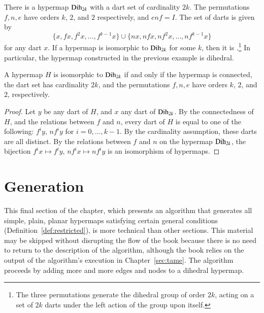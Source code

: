 \begin{example}[dihedral]\label{ex:D2k} 
There is a hypermap ${\operatorname{Dih}}_{2k}$ with a dart set of cardinality $2k$.
The permutations $f,n,e$ have  orders $k$, $2$, and $2$ respectively, and 
$e n f = I$.
The set of darts is given by
\[ 
\{x, f x,f^2 x,\ldots,f^{k-1} x\}\cup \{n x, n f x, n f^2 x,\ldots, n f^{k-1} x\}
\] 
for any dart $x$.
If a hypermap is isomorphic to ${\operatorname{Dih}}_{2k}$ for
some $k$, then it is .\footnote{The three permutations generate the dihedral
group of order $2k$, acting on a set of $2k$ darts under the left action of the group upon itself.}   
In particular,
the hypermap constructed in the previous example is dihedral.
%
\end{example}

\begin{lemma}\cutrate{}\label{lemma:dih-iso}
  A hypermap $H$ is isomorphic to ${\operatorname{Dih}}_{2k}$ if and only if the
  hypermap is connected, the dart set has cardinality $2k$, and the
  permutations $f,n,e$ have orders $k$, $2$, and $2$, respectively.
\end{lemma}

\begin{proof} Let $y$ be any dart of $H$, and $x$ any dart of ${\operatorname{Dih}}_{2k}$.
By the connectedness of $H$, and the relations between $f$ and $n$, every dart of $H$ is
equal to one of the following: $f^i y$, $n f^i y$ for $i=0,\ldots,k-1$.  By the cardinality assumption,
these darts are all distinct.  By the relations between $f$ and $n$ on the hypermap ${\operatorname{Dih}}_{2k}$,
the bijection $f^i x \mapsto f^i y$, $n f^i x \mapsto n f^i y$ is an isomorphism of hypermaps.
\end{proof}


\section{Generation}\label{sec:generation}
%

This final section of the chapter, which presents an algorithm that
generates all simple, plain, planar hypermaps satisfying certain
general conditions (Definition~\ref{def:restricted}), is more
technical than other sections.  This material may be skipped without
disrupting the flow of the book because there is no need to return to
the description of the algorithm, although the book relies on the
output of the algorithm's execution in  Chapter~\ref{sec:tame}.  The
algorithm proceeds by adding more and more edges and nodes to a
dihedral hypermap.

